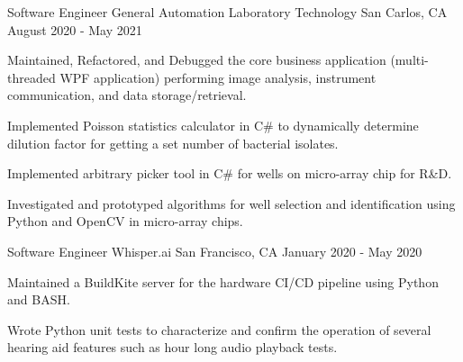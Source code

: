 


\begin{cventries}


\cventry
{Software Engineer} %
{General Automation Laboratory Technology} %
{San Carlos, CA} %
{August 2020 - May 2021} %
{ %
\begin{cvitems}
\item {Maintained, Refactored, and Debugged the core business application (multi-threaded WPF application) performing image analysis, instrument communication, and data storage/retrieval.}
\item {Implemented Poisson statistics calculator in C\# to dynamically determine dilution factor for getting a set number of bacterial isolates.}
\item {Implemented arbitrary picker tool in C\# for wells on micro-array chip for R\&D.}
\item {Investigated and prototyped algorithms for well selection and identification using Python and OpenCV in micro-array chips.}
\end{cvitems}
}



\cventry
{Software Engineer} %
{Whisper.ai} %
{San Francisco, CA} %
{January 2020 - May 2020} %
{ %
\begin{cvitems}
\item {Maintained a BuildKite server for the hardware CI/CD pipeline using Python and BASH.}
\item {Wrote Python unit tests to characterize and confirm the operation of several hearing aid features such as hour long audio playback tests.}
\end{cvitems}
}


\end{cventries}
